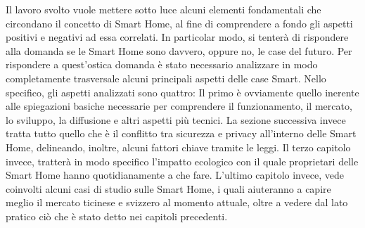 Il lavoro svolto vuole mettere sotto luce alcuni elementi fondamentali che circondano il concetto di Smart Home, al fine di comprendere a fondo gli aspetti positivi e negativi ad essa correlati. In particolar modo, si tenterà di rispondere alla domanda se le Smart Home sono davvero, oppure no, le case del futuro. Per rispondere a quest’ostica domanda è stato necessario analizzare in modo completamente trasversale alcuni principali aspetti delle case Smart. Nello specifico, gli aspetti analizzati sono quattro: 
Il primo è ovviamente quello inerente alle spiegazioni basiche necessarie per comprendere il funzionamento, il mercato, lo sviluppo, la diffusione e altri aspetti più tecnici.
La sezione successiva invece tratta tutto quello che è il conflitto tra sicurezza e privacy all’interno delle Smart Home, delineando, inoltre, alcuni fattori chiave tramite le leggi.
Il terzo capitolo invece, tratterà in modo specifico l’impatto ecologico con il quale proprietari delle Smart Home hanno quotidianamente a che fare. 
L’ultimo capitolo invece, vede coinvolti alcuni casi di studio sulle Smart Home, i quali aiuteranno a capire meglio il mercato ticinese e svizzero al momento attuale, oltre a vedere dal lato pratico ciò che è stato detto nei capitoli precedenti. 
